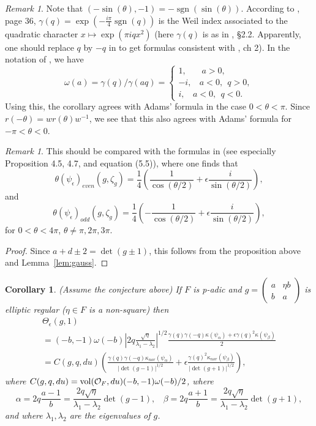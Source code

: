 \documentclass[12pt,letterpaper]{book}
\theoremstyle{plain}
\newtheorem{corollary}[theorem]{Corollary}
\theoremstyle{definition}
\theoremstyle{remark}
\newtheorem{remark}[theorem]{Remark}
\theoremstyle{remark}
\DeclareMathOperator{\sgn}{sgn}
\begin{document}
\begin{remark}
Note that
$(-\sin(\theta),-1)=-\sgn(\sin(\theta))$. According to \cite{Ge2}, page
36, $\gamma(q)=\exp(-{\frac{i\pi}{4}}\sgn(q))$ is the Weil index
associated to the quadratic character
$x\longmapsto \exp(\pi i qx^2)$ (here $\gamma(q)$ is as in \cite{Fl}, \S 2.2.
Apparently, one should replace $q$ by $-q$ in \cite{Fl} to get formulas
consistent with \cite{Ge2}, ch 2). In the notation of \cite{Fl}, we have
\[
\omega(a)=\gamma(q)/\gamma(aq)
=
\left\{
\begin{array}{c}
1,\ \ \ \ \ \ \ \ a>0,\\
-i,\ \ \ \ a<0,\ \ q>0,\\
i,\ \ \ \ a<0,\ \ q<0.
\end{array}
\right.
\]
Using this, the corollary agrees with Adams' formula in the case
$0<\theta <\pi$. Since $r(-\theta)=wr(\theta)w^{-1}$,
we see that this also agrees with Adams' formula for $-\pi<\theta <0$.
\end{remark}

\begin{remark}
This should be compared with the formulas in \cite{Ad1}
(see especially Proposition 4.5, 4.7, and equation (5.5)),
where one finds that
\[
\theta(\psi_\epsilon)_{even}(g,\zeta_g)
={\frac{1}{4}} ({\frac{1}{\cos(\theta/2)}}
+\epsilon {\frac{i}{\sin(\theta/2)}}),
\]
and
\[
\theta(\psi_\epsilon)_{odd}(g,\zeta_g)
={\frac{1}{4}} (-{\frac{1}{\cos(\theta/2)}}
+\epsilon {\frac{i}{\sin(\theta/2)}}),
\]
for $0<\theta <4\pi$, $\theta\not= \pi,2\pi,3\pi$.
\end{remark}

\begin{proof} Since $a+d\pm 2=\det(g\pm 1)$, this follows from
the proposition above and Lemma~\ref{lem:gauss}.
\end{proof}

\begin{corollary} (Assume the conjecture above)
If $F$ is p-adic and
$g=\left(
\begin{array}{cc}
a & \eta b \\
b & a
\end{array}
\right)$ is elliptic regular ($\eta\in F$ is a non-square)
then
\[
\begin{array}{c}
\Theta_\epsilon (g,1)\\
=(-b,-1)\omega(-b)|2q{\frac{\sqrt{\eta}}{\lambda_1 -\lambda_2}}|^{1/2}
{\frac{\gamma(q)\gamma(-q)\kappa(\psi_\alpha)+
\epsilon \gamma(q)^2\kappa(\psi_\beta)}{2}}\\
=C(g,q,du)
({\frac{\gamma(q)\gamma(-q)\kappa_{nor}(\psi_\alpha)}{|\det(g-1)|^{1/2}}}+
\epsilon {\frac{\gamma(q)^2\kappa_{nor}(\psi_\beta)}{|\det(g+1)|^{1/2}}}),
\end{array}
\]
where $C(g,q,du)=\operatorname{vol}({\cal O}_F,du)(-b,-1)\omega(-b)/2$,
where
\[
\alpha=2q{\frac{a-1}{b}}=
{\frac{2q\sqrt{\eta}}{\lambda_1-\lambda_2}}\det(g-1),
\ \ \ \
\beta=2q{\frac{a+1}{b}}
={\frac{2q\sqrt{\eta}}{\lambda_1-\lambda_2}}\det(g+1),
\]
and where $\lambda_1,\lambda_2$ are the eigenvalues of $g$.
\end{corollary}
\end{document}
